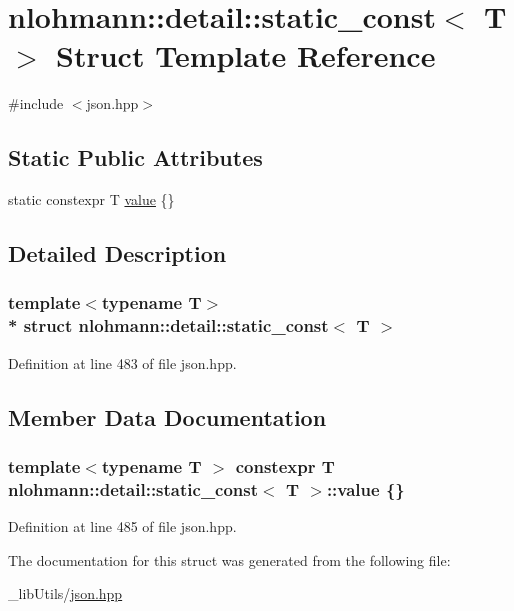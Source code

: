 \hypertarget{structnlohmann_1_1detail_1_1static__const}{}\section{nlohmann\+:\+:detail\+:\+:static\+\_\+const$<$ T $>$ Struct Template Reference}
\label{structnlohmann_1_1detail_1_1static__const}


{\ttfamily \#include $<$json.\+hpp$>$}

\subsection*{Static Public Attributes}
\begin{DoxyCompactItemize}
\item 
static constexpr T \hyperlink{structnlohmann_1_1detail_1_1static__const_a6bb7ab2ddd6abc41fb4ffb7c6dfa237e}{value} \{\}
\end{DoxyCompactItemize}


\subsection{Detailed Description}
\subsubsection*{template$<$typename T$>$\\*
struct nlohmann\+::detail\+::static\+\_\+const$<$ T $>$}



Definition at line 483 of file json.\+hpp.



\subsection{Member Data Documentation}
\subsubsection[{\texorpdfstring{value}{value}}]{\setlength{\rightskip}{0pt plus 5cm}template$<$typename T $>$ constexpr T {\bf nlohmann\+::detail\+::static\+\_\+const}$<$ T $>$\+::value \{\}\hspace{0.3cm}{\ttfamily [static]}}\hypertarget{structnlohmann_1_1detail_1_1static__const_a6bb7ab2ddd6abc41fb4ffb7c6dfa237e}{}\label{structnlohmann_1_1detail_1_1static__const_a6bb7ab2ddd6abc41fb4ffb7c6dfa237e}


Definition at line 485 of file json.\+hpp.



The documentation for this struct was generated from the following file\+:\begin{DoxyCompactItemize}
\item 
\+\_\+lib\+Utils/\hyperlink{json_8hpp}{json.\+hpp}\end{DoxyCompactItemize}
